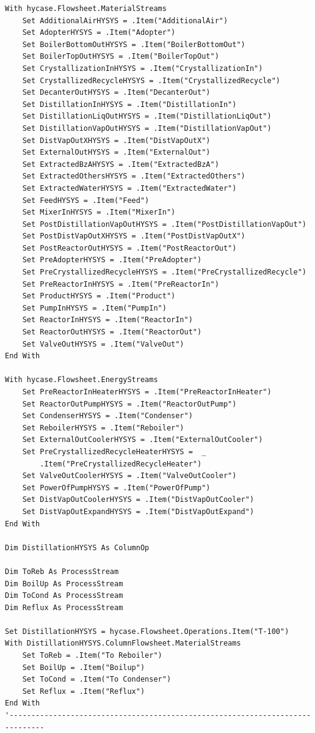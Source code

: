 \documentclass[a4j]{jsreport}
\begin{document}
\begin{lstlisting}[caption=HYSYSとpythonを繋ぐコード]
With hycase.Flowsheet.MaterialStreams
    Set AdditionalAirHYSYS = .Item("AdditionalAir")
    Set AdopterHYSYS = .Item("Adopter")
    Set BoilerBottomOutHYSYS = .Item("BoilerBottomOut")
    Set BoilerTopOutHYSYS = .Item("BoilerTopOut")
    Set CrystallizationInHYSYS = .Item("CrystallizationIn")
    Set CrystallizedRecycleHYSYS = .Item("CrystallizedRecycle")
    Set DecanterOutHYSYS = .Item("DecanterOut")
    Set DistillationInHYSYS = .Item("DistillationIn")
    Set DistillationLiqOutHYSYS = .Item("DistillationLiqOut")
    Set DistillationVapOutHYSYS = .Item("DistillationVapOut")
    Set DistVapOutXHYSYS = .Item("DistVapOutX")
    Set ExternalOutHYSYS = .Item("ExternalOut")
    Set ExtractedBzAHYSYS = .Item("ExtractedBzA")
    Set ExtractedOthersHYSYS = .Item("ExtractedOthers")
    Set ExtractedWaterHYSYS = .Item("ExtractedWater")
    Set FeedHYSYS = .Item("Feed")
    Set MixerInHYSYS = .Item("MixerIn")
    Set PostDistillationVapOutHYSYS = .Item("PostDistillationVapOut")
    Set PostDistVapOutXHYSYS = .Item("PostDistVapOutX")
    Set PostReactorOutHYSYS = .Item("PostReactorOut")
    Set PreAdopterHYSYS = .Item("PreAdopter")
    Set PreCrystallizedRecycleHYSYS = .Item("PreCrystallizedRecycle")
    Set PreReactorInHYSYS = .Item("PreReactorIn")
    Set ProductHYSYS = .Item("Product")
    Set PumpInHYSYS = .Item("PumpIn")
    Set ReactorInHYSYS = .Item("ReactorIn")
    Set ReactorOutHYSYS = .Item("ReactorOut")
    Set ValveOutHYSYS = .Item("ValveOut")
End With

With hycase.Flowsheet.EnergyStreams
    Set PreReactorInHeaterHYSYS = .Item("PreReactorInHeater")
    Set ReactorOutPumpHYSYS = .Item("ReactorOutPump")
    Set CondenserHYSYS = .Item("Condenser")
    Set ReboilerHYSYS = .Item("Reboiler")
    Set ExternalOutCoolerHYSYS = .Item("ExternalOutCooler")
    Set PreCrystallizedRecycleHeaterHYSYS =  _
        .Item("PreCrystallizedRecycleHeater")
    Set ValveOutCoolerHYSYS = .Item("ValveOutCooler")
    Set PowerOfPumpHYSYS = .Item("PowerOfPump")
    Set DistVapOutCoolerHYSYS = .Item("DistVapOutCooler")
    Set DistVapOutExpandHYSYS = .Item("DistVapOutExpand")
End With

Dim DistillationHYSYS As ColumnOp

Dim ToReb As ProcessStream
Dim BoilUp As ProcessStream
Dim ToCond As ProcessStream
Dim Reflux As ProcessStream

Set DistillationHYSYS = hycase.Flowsheet.Operations.Item("T-100")
With DistillationHYSYS.ColumnFlowsheet.MaterialStreams
    Set ToReb = .Item("To Reboiler")
    Set BoilUp = .Item("Boilup")
    Set ToCond = .Item("To Condenser")
    Set Reflux = .Item("Reflux")
End With
'------------------------------------------------------------------------------


\end{lstlisting}
\end{document}
